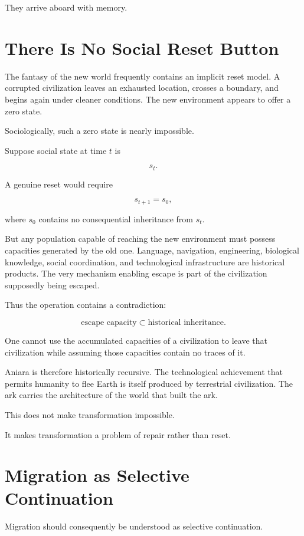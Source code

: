 \documentclass[11pt,oneside]{book}
\theoremstyle{definition}
\theoremstyle{remark}
\begin{document}
They arrive aboard with memory.

\section{There Is No Social Reset Button}

The fantasy of the new world frequently contains an implicit reset model. A corrupted civilization leaves an exhausted location, crosses a boundary, and begins again under cleaner conditions. The new environment appears to offer a zero state.

Sociologically, such a zero state is nearly impossible.

Suppose social state at time \(t\) is

\[
s_t.
\]

A genuine reset would require

\[
s_{t+1}=s_0,
\]

where \(s_0\) contains no consequential inheritance from \(s_t\).

But any population capable of reaching the new environment must possess capacities generated by the old one. Language, navigation, engineering, biological knowledge, social coordination, and technological infrastructure are historical products. The very mechanism enabling escape is part of the civilization supposedly being escaped.

Thus the operation contains a contradiction:

\[
\text{escape capacity}
\subset
\text{historical inheritance}.
\]

One cannot use the accumulated capacities of a civilization to leave that civilization while assuming those capacities contain no traces of it.

Aniara is therefore historically recursive. The technological achievement that permits humanity to flee Earth is itself produced by terrestrial civilization. The ark carries the architecture of the world that built the ark.

This does not make transformation impossible.

It makes transformation a problem of repair rather than reset.

\section{Migration as Selective Continuation}

Migration should consequently be understood as selective continuation.
\end{document}
